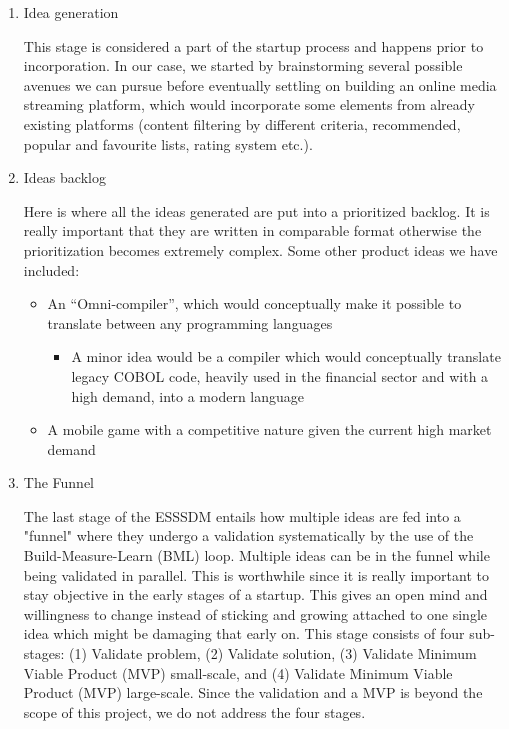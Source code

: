 \begin{enumerate}
\item Idea generation

This stage is considered a part of the startup process and happens prior to incorporation. In our case, we started by brainstorming several possible avenues we can pursue before eventually settling on building an online media streaming platform, which would incorporate some elements from already existing platforms (content filtering by different criteria, recommended, popular and favourite lists, rating system etc.). 
\item Ideas backlog

Here is where all the ideas generated are put into a prioritized backlog. It is really important that they are written in comparable format otherwise the prioritization  becomes extremely complex. Some other product ideas we have included:
\begin{itemize}
    \item An ``Omni-compiler'', which would conceptually make it possible to translate between any programming languages
    \begin{itemize}
        \item A minor idea would be a compiler which would conceptually translate legacy COBOL code, heavily used in the financial sector and with a high demand, into a modern language
    \end{itemize}
    \item A mobile game with a competitive nature given the current high market demand
\end{itemize}
\item The Funnel

The last stage of the ESSSDM entails how multiple ideas are fed into a "funnel" where they undergo a validation systematically by the use of the Build-Measure-Learn (BML) loop. Multiple ideas can be in the funnel while being validated in parallel. This is worthwhile since it is really important to stay objective in the early stages of a startup. This gives an open mind and willingness to change instead of sticking and growing attached to one single idea which might be damaging that early on. This stage consists of four sub-stages: (1) Validate problem, (2) Validate solution, (3) Validate Minimum Viable Product (MVP) small-scale, and (4) Validate Minimum Viable Product (MVP) large-scale. Since the validation and a MVP is beyond the scope of this project, we do not address the four stages.
 \end{enumerate}
 
